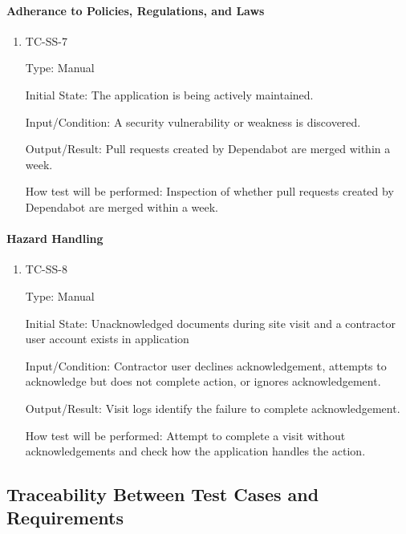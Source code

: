 \documentclass[12pt, titlepage]{article}
\begin{document}
\paragraph{Adherance to Policies, Regulations, and Laws}

\begin{enumerate}

  \item{TC-SS-7\\}

    Type: Manual

    Initial State: The application is being actively maintained.

    Input/Condition: A security vulnerability or weakness is discovered.

    Output/Result: Pull requests created by Dependabot are merged within a week.

    How test will be performed: Inspection of whether pull requests
    created by Dependabot are merged within a week.

\end{enumerate}

\paragraph{Hazard Handling}

\begin{enumerate}

  \item{TC-SS-8\\}

    Type: Manual

    Initial State: Unacknowledged documents during site visit and a
    contractor user account
    exists in application

    Input/Condition: Contractor user declines acknowledgement, attempts to
    acknowledge but does not complete action, or ignores acknowledgement.

    Output/Result: Visit logs identify the failure to complete acknowledgement.

    How test will be performed: Attempt to complete a visit without
    acknowledgements
    and check how the application handles the action.

\end{enumerate}

\subsection{Traceability Between Test Cases and Requirements}
\end{document}
